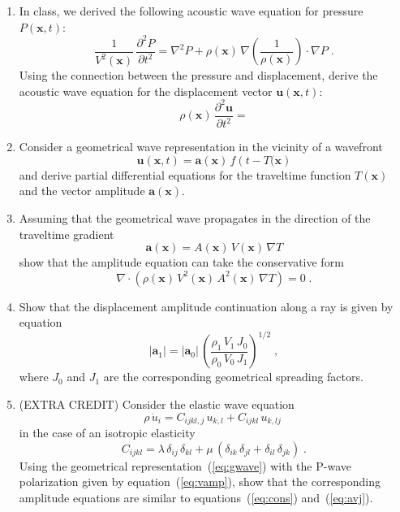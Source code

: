 \begin{enumerate}
\item In class, we derived the following acoustic wave equation for
  pressure $P(\mathbf{x},t)$:
\begin{equation}
{\frac{1}{V^2(\mathbf{x})}}\,{\frac{\partial^2 P}{\partial t^2}} =\nabla^2 P + 
\rho(\mathbf{x})\,
\nabla\left(\frac{1}{\rho(\mathbf{x})}\right) \cdot \nabla P\;.
\label{eq:pwave}
\end{equation}
Using the connection between the pressure and displacement, derive the
acoustic wave equation for the displacement vector
$\mathbf{u}(\mathbf{x},t)$:
\begin{equation}
  \label{eq:uwave}
  \rho(\mathbf{x})\,\frac{\partial^2 \mathbf{u}}{\partial t^2} =
\end{equation}
\item Consider a geometrical wave representation in the vicinity of a wavefront
\begin{equation}
  {\mathbf{u}(\mathbf{x},t)} = \mathbf{a}(\mathbf{x})\,f\left(t-T(\mathbf{x}\right)
  \label{eq:gwave}
\end{equation}
and derive partial differential equations for the traveltime function
$T(\mathbf{x})$ and the vector amplitude $\mathbf{a}(\mathbf{x})$.
\item Assuming that the geometrical wave propagates in the direction
  of the traveltime gradient
\begin{equation}
  {\mathbf{a}(\mathbf{x})} = A(\mathbf{x})\,V(\mathbf{x})\,\nabla T
  \label{eq:vamp}
\end{equation}
show that the amplitude equation can take the conservative form
\begin{equation}
  \label{eq:cons}
  \nabla \cdot \left(\rho(\mathbf{x})\,V^2(\mathbf{x})\,A^2(\mathbf{x})\,\nabla T\right) = 0\;.
\end{equation}
\item Show that the displacement amplitude continuation along a ray is given by equation 
\begin{equation}
  \label{eq:avj}
  \left|\mathbf{a}_1\right| = \left|\mathbf{a}_0\right|\,
  \left(\frac{\rho_1\,V_1\,J_0}{\rho_0\,V_0\,J_1}\right)^{1/2}\;, 
\end{equation}
where $J_0$ and $J_1$ are the corresponding geometrical spreading factors.
\item (EXTRA CREDIT) Consider the elastic wave equation
\begin{equation}
  \label{eq:ewave}
  \rho\,\ddot{u}_i = C_{ijkl,j}\,u_{k,l} + C_{ijkl}\,u_{k,lj}\;
\end{equation}
in the case of an isotropic elasticity
\begin{equation}
  \label{eq:lame}
  C_{ijkl} = \lambda\,\delta_{ij}\,\delta_{kl} + 
  \mu\,(\delta_{ik}\,\delta_{jl} + \delta_{il}\,\delta_{jk})\;.
\end{equation}
Using the geometrical representation~(\ref{eq:gwave}) with the P-wave
polarization given by equation~(\ref{eq:vamp}), show that the
corresponding amplitude equations are similar to
equations~(\ref{eq:cons}) and~(\ref{eq:avj}).
\end{enumerate}

